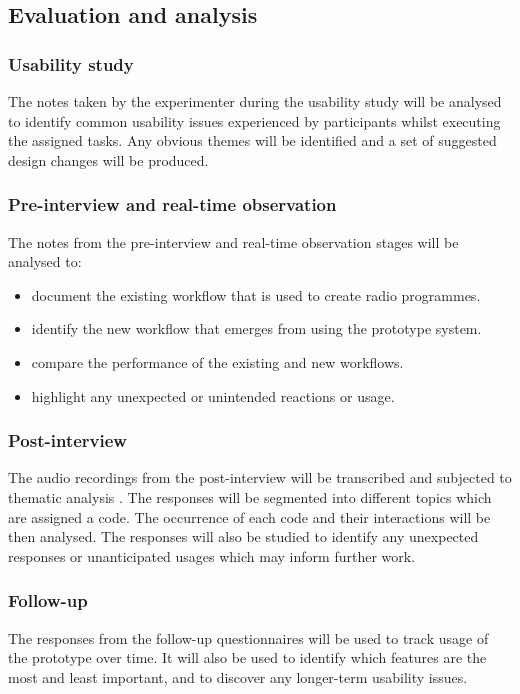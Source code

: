 \subsection{Evaluation and analysis}
\subsubsection{Usability study}
The notes taken by the experimenter during the usability study will be analysed
to identify common usability issues experienced by participants whilst
executing the assigned tasks. Any obvious themes will be identified and a set
of suggested design changes will be produced.

\subsubsection{Pre-interview and real-time observation}
The notes from the pre-interview and real-time observation stages will be
analysed to:
\begin{itemize}
\item document the existing workflow that is used to create radio programmes.
\item identify the new workflow that emerges from using the prototype system.
\item compare the performance of the existing and new workflows.
\item highlight any unexpected or unintended reactions or usage.
\end{itemize}

\subsubsection{Post-interview}
The audio recordings from the post-interview will be transcribed and subjected
to thematic analysis \cite{Braun2006}. The responses will be segmented into
different topics which are assigned a code. The occurrence of each code and
their interactions will be then analysed. The responses will also be studied to
identify any unexpected responses or unanticipated usages which may inform
further work.

\subsubsection{Follow-up}
The responses from the follow-up questionnaires will be used to track usage of
the prototype over time. It will also be used to identify which features are
the most and least important, and to discover any longer-term usability issues.

